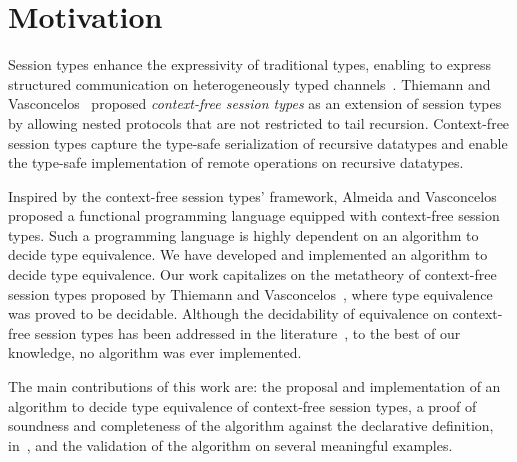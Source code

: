 \section{Motivation}
\label{sec:introduction}

Session types enhance the expressivity of traditional types, enabling
to express structured communication on heterogeneously typed
channels~\cite{DBLP:conf/concur/Honda93,DBLP:conf/parle/TakeuchiHK94}.
Thiemann and
Vasconcelos~\cite{thiemann2016context} proposed {\it context-free
  session types} as an extension of session types by allowing nested
protocols that are not restricted to tail recursion. Context-free
session types capture the type-safe serialization of recursive
datatypes and enable the type-safe implementation of remote operations
on recursive datatypes.

Inspired by the context-free session types' framework, Almeida and
Vasconcelos~\cite{bernardo} proposed a functional programming language
equipped with context-free session types.  Such a programming language
is highly dependent on an algorithm to decide type equivalence. We
have developed and implemented an algorithm to decide type
equivalence. Our work capitalizes on the metatheory of context-free
session types proposed by Thiemann and
Vasconcelos~\cite{thiemann2016context}, where type equivalence was
proved to be decidable. Although the decidability of equivalence on
context-free session types has been addressed in the
literature~\cite{DBLP:journals/iandc/ChristensenHS95,janvcar1999techniques,thiemann2016context},
to the best of our knowledge, no algorithm was ever implemented.

The main contributions of this work are: the proposal and implementation of an algorithm to decide
type equivalence of context-free session types, a proof of soundness and completeness of
the algorithm against the declarative definition,
in~\cite{thiemann2016context}, %
and the validation of  the algorithm on several meaningful examples.


